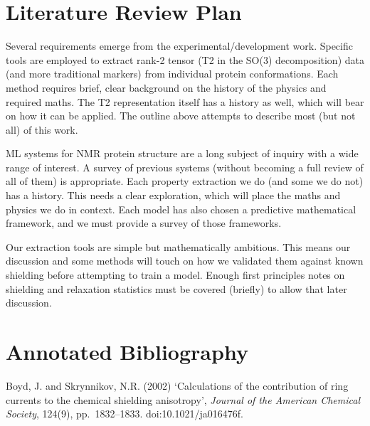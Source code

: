 \documentclass[11pt,a4paper]{article}
\begin{document}

\section*{Literature Review Plan}

Several requirements emerge from the experimental/development work. Specific tools are employed to extract rank-2 tensor (T2 in the SO(3) decomposition) data (and more traditional markers) from individual protein conformations. Each method requires brief, clear background on the history of the physics and required maths. The T2 representation itself has a history as well, which will bear on how it can be applied. The outline above attempts to describe most (but not all) of this work.

ML systems for NMR protein structure are a long subject of inquiry with a wide range of interest. A survey of previous systems (without becoming a full review of all of them) is appropriate. Each property extraction we do (and some we do not) has a history. This needs a clear exploration, which will place the maths and physics we do in context. Each model has also chosen a predictive mathematical framework, and we must provide a survey of those frameworks.

Our extraction tools are simple but mathematically ambitious. This means our discussion and some methods will touch on how we validated them against known shielding before attempting to train a model. Enough first principles notes on shielding and relaxation statistics must be covered (briefly) to allow that later discussion.


\section*{Annotated Bibliography}

Boyd, J. and Skrynnikov, N.R. (2002) `Calculations of the contribution of ring currents to the chemical shielding anisotropy', \textit{Journal of the American Chemical Society}, 124(9), pp.~1832--1833. doi:10.1021/ja016476f.
\end{document}
